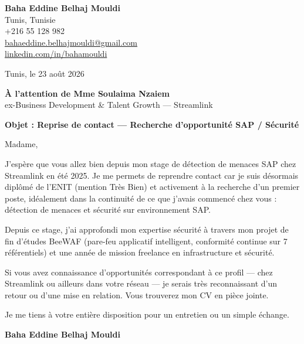 \documentclass[a4paper,11pt]{article}
\begin{document}
\begin{flushright}
{\bfseries Baha Eddine Belhaj Mouldi}\\
Tunis, Tunisie\\
+216 55 128 982\\
\href{mailto:bahaeddine.belhajmouldi@gmail.com}{bahaeddine.belhajmouldi@gmail.com}\\
\href{https://linkedin.com/in/bahamouldi}{linkedin.com/in/bahamouldi}
\end{flushright}
\vspace{0.8cm}
\begin{flushleft}
Tunis, le 23 ao\^ut 2026
\vspace{0.8cm}

{\bfseries \`A l'attention de Mme Soulaima Nzaiem}\\
ex-Business Development \& Talent Growth --- Streamlink
\vspace{0.6cm}

{\bfseries Objet : Reprise de contact --- Recherche d'opportunit\'e SAP / S\'ecurit\'e}
\end{flushleft}
\vspace{0.6cm}
Madame,

J'esp\`ere que vous allez bien depuis mon stage de d\'etection de menaces SAP chez Streamlink en \'et\'e 2025. Je me permets de reprendre contact car je suis d\'esormais dipl\^om\'e de l'ENIT (mention Tr\`es Bien) et activement \`a la recherche d'un premier poste, id\'ealement dans la continuit\'e de ce que j'avais commenc\'e chez vous : d\'etection de menaces et s\'ecurit\'e sur environnement SAP.

Depuis ce stage, j'ai approfondi mon expertise s\'ecurit\'e \`a travers mon projet de fin d'\'etudes BeeWAF (pare-feu applicatif intelligent, conformit\'e continue sur 7 r\'ef\'erentiels) et une ann\'ee de mission freelance en infrastructure et s\'ecurit\'e.

Si vous avez connaissance d'opportunit\'es correspondant \`a ce profil --- chez Streamlink ou ailleurs dans votre r\'eseau --- je serais tr\`es reconnaissant d'un retour ou d'une mise en relation. Vous trouverez mon CV en pi\`ece jointe.

Je me tiens \`a votre enti\`ere disposition pour un entretien ou un simple \'echange.

\vspace{0.8cm}
\begin{flushright}
{\bfseries Baha Eddine Belhaj Mouldi}
\end{flushright}
\end{document}
